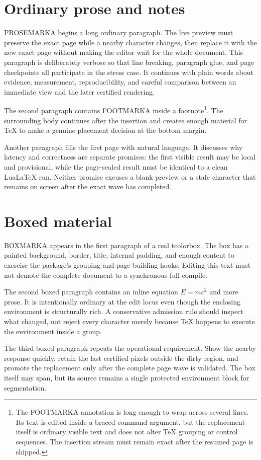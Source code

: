 \documentclass[11pt,a4paper]{article}
\begin{document}
\section{Ordinary prose and notes}

PROSEMARKA begins a long ordinary paragraph. The live preview must preserve
the exact page while a nearby character changes, then replace it with the
new exact page without making the editor wait for the whole document. This
paragraph is deliberately verbose so that line breaking, paragraph glue,
and page checkpoints all participate in the stress case. It continues with
plain words about evidence, measurement, reproducibility, and careful
comparison between an immediate view and the later certified rendering.

The second paragraph contains FOOTMARKA inside a footnote\footnote{The
FOOTMARKA annotation is long enough to wrap across several lines. Its text
is edited inside a braced command argument, but the replacement itself is
ordinary visible text and does not alter TeX grouping or control sequences.
The insertion stream must remain exact after the resumed page is shipped.}.
The surrounding body continues after the insertion and creates enough
material for TeX to make a genuine placement decision at the bottom margin.

Another paragraph fills the first page with natural language. It discusses
why latency and correctness are separate promises: the first visible result
may be local and provisional, while the page-sealed result must be identical
to a clean LuaLaTeX run. Neither promise excuses a blank preview or a stale
character that remains on screen after the exact wave has completed.

\clearpage

\section{Boxed material}

\begin{tcolorbox}[
  enhanced,
  breakable,
  colback=blue!3,
  colframe=blue!55!black,
  title={A breakable evidence box}
]
BOXMARKA appears in the first paragraph of a real tcolorbox. The box has a
painted background, border, title, internal padding, and enough content to
exercise the package's grouping and page-building hooks. Editing this text
must not demote the complete document to a synchronous full compile.

The second boxed paragraph contains an inline equation
$E=mc^2$ and more prose. It is intentionally ordinary at the edit locus even
though the enclosing environment is structurally rich. A conservative
admission rule should inspect what changed, not reject every character merely
because TeX happens to execute the environment inside a group.

The third boxed paragraph repeats the operational requirement. Show the
nearby response quickly, retain the last certified pixels outside the dirty
region, and promote the replacement only after the complete page wave is
validated. The box itself may span, but its source remains a single protected
environment block for segmentation.
\end{tcolorbox}
\end{document}
